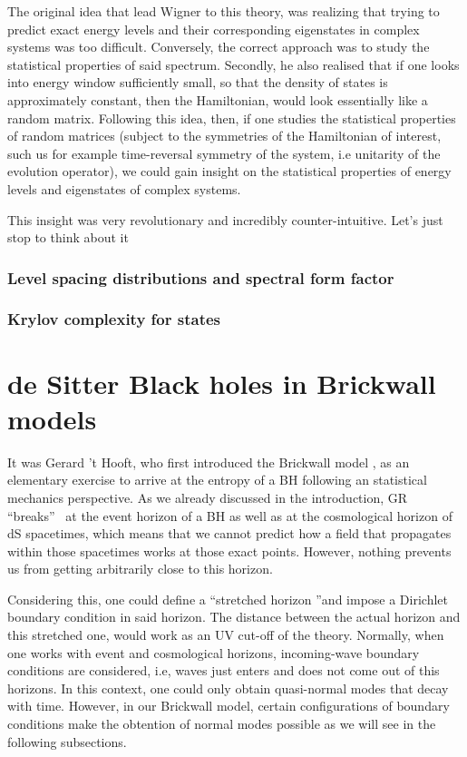 \documentclass[11pt,a4paper]{article}
\begin{document}
The original idea that lead Wigner to this theory, was realizing that trying to predict exact energy levels and their corresponding eigenstates in complex systems was too difficult. Conversely, the correct approach was to study the statistical properties of said spectrum. Secondly, he also realised that if one looks into energy window sufficiently small, so that the density of states is approximately constant, then the Hamiltonian, would look essentially like a random matrix. Following this idea, then, if one studies the statistical properties of random matrices (subject to the symmetries of the Hamiltonian of interest, such us for example time-reversal symmetry of the system, i.e unitarity of the evolution operator), we could gain insight on the statistical properties of energy levels and eigenstates of complex systems.

This insight was very revolutionary and incredibly counter-intuitive. Let's just stop to think about it



\subsubsection{Level spacing distributions and spectral form factor}

\subsubsection{Krylov complexity for states}

%    

\section{de Sitter Black holes in Brickwall models}

It was Gerard 't Hooft, who first introduced the Brickwall model \cite{tHooft:1984kcu}, as an elementary exercise to arrive at the entropy of a BH following an statistical mechanics perspective. As we already discussed in the introduction, GR \textquotedblleft breaks\textquotedblright~  at the event horizon of a BH as well as at the cosmological horizon of dS spacetimes, which means that we cannot predict how a field that propagates within those spacetimes works at those exact points. However, nothing prevents us from getting arbitrarily close to this horizon.

Considering this, one could define a \textquotedblleft stretched horizon \textquotedblright and impose a Dirichlet boundary condition in said horizon. The distance between the actual horizon and this stretched one, would work as an UV cut-off of the theory. Normally, when one works with event and cosmological horizons, incoming-wave boundary conditions are considered, i.e, waves just enters and does not come out of this horizons. In this context, one could only obtain quasi-normal modes that decay with time. However, in our Brickwall model, certain configurations of boundary conditions make the obtention of normal modes possible as we will see in the following subsections.
\end{document}
